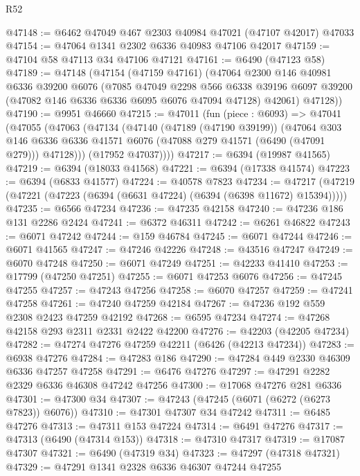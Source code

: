 \begin{lexlean}{R52}
\begin{coremodule}
@47148 := @6462 @47049 @467 @2303 @40984 @47021 (@47107 @42017) @47033
@47154 := @47064 @1341 @2302 @6336 @40983 @47106 @42017
@47159 := @47104 @58 @47113 @34 @47106 @47121
@47161 := @6490 (@47123 @58)
@47189 := @47148
    (@47154
      (@47159 @47161)
      (@47064
        @2300
        @146
        @40981
        @6336
        @39200
        @6076
        (@7085
          @47049
          @2298
          @566
          @6338
          @39196
          @6097
          @39200
          (@47082 @146 @6336 @6336 @6095 @6076 @47094 @47128)
          @42061)
        @47128))
@47190 := @9951 @46660
@47215 := @47011
    (fun (piece : @6093) =>
    @47041
      (@47055
        (@47063
          (@47134
            (@47140
              (@47189 (@47190 @39199))
              (@47064
                @303
                @146
                @6336
                @6336
                @41571
                @6076
                (@47088 @279 @41571 (@6490 (@47091 @279)))
                @47128)))
          (@17952 @47037))))
@47217 := @6394 (@19987 @41565)
@47219 := @6394 (@18033 @41568)
@47221 := @6394 (@17338 @41574)
@47223 := @6394 (@6833 @41577)
@47224 := @40578 @7823
@47234 := @47217 (@47219 (@47221 (@47223 (@6394 (@6631 @47224) (@6394 (@6398 @11672) @15394)))))
@47235 := @6566 @47234
@47236 := @47235 @42158
@47240 := @47236 @186 @131 @2286 @2424
@47241 := @6372 @46311
@47242 := @6261 @46822
@47243 := @6071 @47242
@47244 := @159 @46784
@47245 := @6071 @47244
@47246 := @6071 @41565
@47247 := @47246 @42226
@47248 := @43516 @47247
@47249 := @6070 @47248
@47250 := @6071 @47249
@47251 := @42233 @41410
@47253 := @17799 (@47250 @47251)
@47255 := @6071 @47253 @6076
@47256 := @47245 @47255
@47257 := @47243 @47256
@47258 := @6070 @47257
@47259 := @47241 @47258
@47261 := @47240 @47259 @42184
@47267 := @47236 @192 @559 @2308 @2423 @47259 @42192
@47268 := @6595 @47234
@47274 := @47268 @42158 @293 @2311 @2331 @2422 @42200
@47276 := @42203 (@42205 @47234)
@47282 := @47274 @47276 @47259 @42211 (@6426 (@42213 @47234))
@47283 := @6938 @47276
@47284 := @47283 @186
@47290 := @47284 @449 @2330 @46309 @6336 @47257 @47258
@47291 := @6476 @47276
@47297 := @47291 @2282 @2329 @6336 @46308 @47242 @47256
@47300 := @17068 @47276 @281 @6336
@47301 := @47300 @34
@47307 := @47243 (@47245 (@6071 (@6272 (@6273 @7823)) @6076))
@47310 := @47301 @47307 @34 @47242
@47311 := @6485 @47276
@47313 := @47311 @153 @47224
@47314 := @6491 @47276
@47317 := @47313 (@6490 (@47314 @153))
@47318 := @47310 @47317
@47319 := @17087 @47307
@47321 := @6490 (@47319 @34)
@47323 := @47297 (@47318 @47321)
@47329 := @47291 @1341 @2328 @6336 @46307 @47244 @47255

\end{coremodule}
\end{lexlean}
